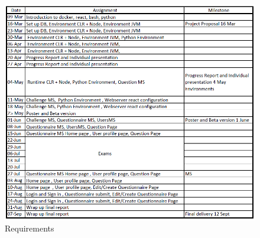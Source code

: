 \begin{center}
	\begin{figure}[H]
  		\includegraphics[scale=0.9]{./imgs/requisitios.PNG}
  		\caption{Requirements}
  		\label{fig:requirements}
	\end{figure}
\end{center}

